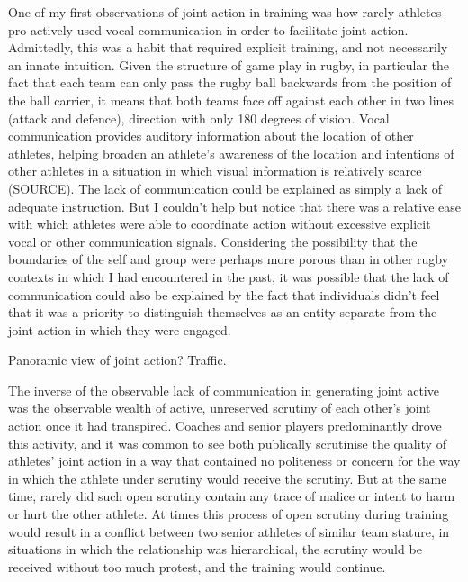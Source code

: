\begin{CJK}{UTF8}{gbsn}
  One of my first observations of joint action in training was how rarely athletes pro-actively used vocal communication in order to facilitate joint action.  Admittedly, this was a habit that required explicit training, and not necessarily an innate intuition.  Given the structure of game play in rugby, in particular the fact that each team can only pass the rugby ball backwards from the position of the ball carrier, it means that both teams face off against each other in two lines (attack and defence), direction with only 180 degrees of vision. Vocal communication provides auditory information about the location of other athletes, helping broaden an athlete's awareness of the location and intentions of other athletes in a situation in which visual information is relatively scarce (SOURCE).  The lack of communication could be explained as simply a lack of adequate instruction.  But I couldn't help but notice that there was a relative ease with which athletes were able to coordinate action without excessive explicit vocal or other communication signals.  Considering the possibility that the boundaries of the self and group were perhaps more porous than in other rugby contexts in which I had encountered in the past, it was possible that the lack of communication could also be explained by the fact that individuals didn't feel that it was a priority to distinguish themselves as an entity separate from the joint action in which they were engaged.

  Panoramic view of joint action? Traffic.



  The inverse of the observable lack of communication in generating joint active was the observable wealth of active, unreserved scrutiny of each other's joint action once it had transpired.  Coaches and senior players predominantly drove this activity, and it was common to see both publically scrutinise the quality of athletes' joint action in a way that contained no politeness or concern for the way in which the athlete under scrutiny would receive the scrutiny. But at the same time, rarely did such open scrutiny contain any trace of malice or intent to harm or hurt the other athlete.  At times this process of open scrutiny during training would result in a conflict between two senior athletes of similar team stature, in situations in which the relationship was hierarchical, the scrutiny would be received without too much protest, and the training would continue.


\end{CJK}
